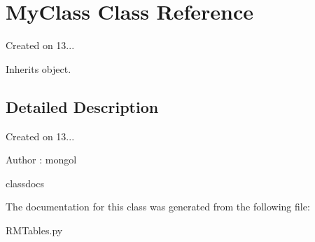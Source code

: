 \hypertarget{classrpgToolDefinitions_1_1RMTables_1_1MyClass}{}\section{My\+Class Class Reference}
\label{classrpgToolDefinitions_1_1RMTables_1_1MyClass}


Created on 13...  




Inherits object.



\subsection{Detailed Description}
Created on 13... 

\begin{DoxyAuthor}{Author}
\+: mongol \begin{DoxyVerb}classdocs\end{DoxyVerb}
 
\end{DoxyAuthor}


The documentation for this class was generated from the following file\+:\begin{DoxyCompactItemize}
\item 
R\+M\+Tables.\+py\end{DoxyCompactItemize}
